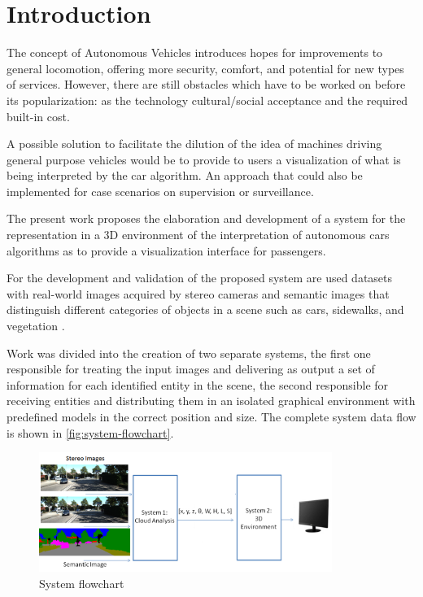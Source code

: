 
\chapter[Introduction]{Introduction}


    The concept of Autonomous Vehicles introduces hopes for improvements to general locomotion, offering more security, comfort, and potential for new types of services. However, there are still obstacles which have to be worked on before its popularization: as the technology cultural/social acceptance and the required built-in cost.

    A possible solution to facilitate the dilution of the idea of machines driving general purpose vehicles would be to provide to users a visualization of what is being interpreted by the car algorithm. An approach that could also be implemented for case scenarios on supervision or surveillance. 

    The present work proposes the elaboration and development of a system for the representation in a 3D environment of the interpretation of autonomous cars algorithms as to provide a visualization interface for passengers.
    
    For the development and validation of the proposed system are used datasets with real-world images acquired by stereo cameras \cite{Geiger2013IJRR} and semantic images that distinguish different categories of objects in a scene such as cars, sidewalks, and vegetation \cite{giovaniThesis}. 
    
    Work was divided into the creation of two separate systems, the first one responsible for treating the input images and delivering as output a set of information for each identified entity in the scene, the second responsible for receiving entities and distributing them in an isolated graphical environment with predefined models in the correct position and size. The complete system data flow is shown in \autoref{fig:system-flowchart}.
        
    \begin{figure}[H]
         \caption{\label{fig:system-flowchart}System flowchart}
         \begin{center}
            \includegraphics[width=0.85\textwidth]{images/proposed-system-flow-chart.png}
         \end{center}
    \end{figure}
    
